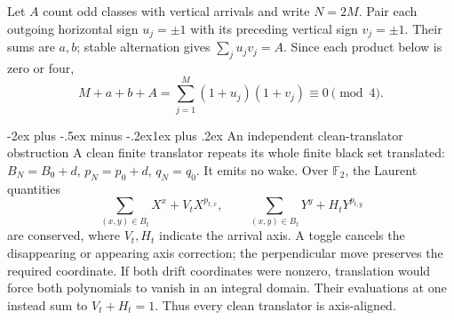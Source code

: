 \documentclass[11pt,letterpaper]{article}
\makeatletter
\renewcommand\section{\@startsection{section}{1}{\z@}%
  {-2ex plus -.5ex minus -.2ex}{1ex plus .2ex}%
  {\normalfont\Large\bfseries}}
\newcommand{\F}{\mathbb F}
\makeatother
\begin{document}
Let $A$ count odd classes with vertical arrivals and write $N=2M$.
Pair each outgoing horizontal sign $u_j=\pm1$ with its preceding vertical
sign $v_j=\pm1$. Their sums are $a,b$; stable alternation gives
$\sum_j u_jv_j=A$. Since each product below is zero or four,
\[
M+a+b+A=\sum_{j=1}^{M}(1+u_j)(1+v_j)\equiv0\pmod4.
\]

\section{An independent clean-translator obstruction}
A clean finite translator repeats its whole finite black set translated:
$B_N=B_0+d$, $p_N=p_0+d$, $q_N=q_0$. It emits no wake. Over $\F_2$,
the Laurent quantities
\[
\sum_{(x,y)\in B_t}X^x+V_tX^{p_{t,x}},\qquad
\sum_{(x,y)\in B_t}Y^y+H_tY^{p_{t,y}}
\]
are conserved, where $V_t,H_t$ indicate the arrival axis. A toggle
cancels the disappearing or appearing axis correction; the perpendicular
move preserves the required coordinate. If both drift coordinates were
nonzero, translation would force both polynomials to vanish in an integral
domain. Their evaluations at one instead sum to $V_t+H_t=1$.
Thus every clean translator is axis-aligned.
\end{document}
